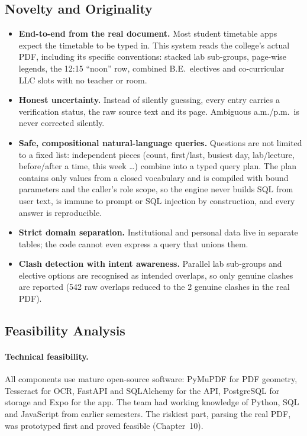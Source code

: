 \subsection{Novelty and Originality}
\begin{itemize}
\item \textbf{End-to-end from the real document.} Most student timetable apps expect the timetable to
      be typed in. This system reads the college's actual PDF, including its specific conventions:
      stacked lab sub-groups, page-wise legends, the 12:15 ``noon'' row, combined B.E.\ electives and
      co-curricular LLC slots with no teacher or room.
\item \textbf{Honest uncertainty.} Instead of silently guessing, every entry carries a verification
      status, the raw source text and its page. Ambiguous a.m./p.m.\ is never corrected silently.
\item \textbf{Safe, compositional natural-language queries.} Questions are not limited to a fixed list:
      independent pieces (count, first/last, busiest day, lab/lecture, before/after a time, this week …)
      combine into a typed query plan. The plan contains only values from a closed vocabulary and is
      compiled with bound parameters and the caller's role scope, so the engine never builds SQL from
      user text, is immune to prompt or SQL injection by construction, and every answer is reproducible.
\item \textbf{Strict domain separation.} Institutional and personal data live in separate tables;
      the code cannot even express a query that unions them.
\item \textbf{Clash detection with intent awareness.} Parallel lab sub-groups and elective options are
      recognised as intended overlaps, so only genuine clashes are reported (542 raw overlaps reduced
      to the 2 genuine clashes in the real PDF).
\end{itemize}

\subsection{Feasibility Analysis}
\paragraph{Technical feasibility.}
All components use mature open-source software: PyMuPDF for PDF geometry, Tesseract for OCR,
FastAPI and SQLAlchemy for the API, PostgreSQL for storage and Expo for the app. The team had
working knowledge of Python, SQL and JavaScript from earlier semesters. The riskiest part, parsing
the real PDF, was prototyped first and proved feasible (Chapter~10).

